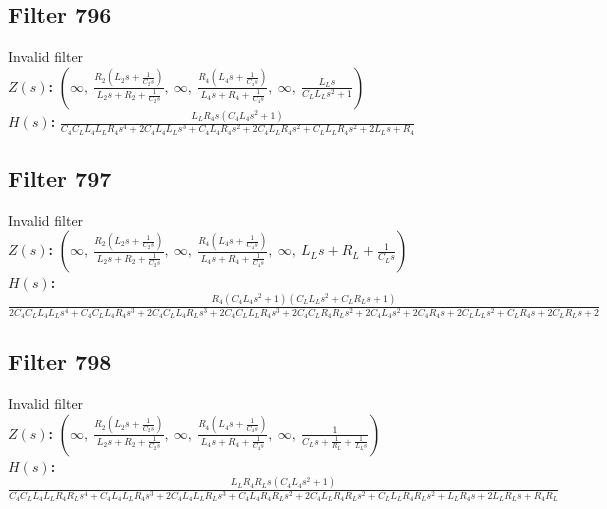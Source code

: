 \documentclass{article}
\begin{document}
\subsection*{Filter 796}
Invalid filter \\ 
\textbf{$Z(s)$:} $\left( \infty, \  \frac{R_{2} \left(L_{2} s + \frac{1}{C_{2} s}\right)}{L_{2} s + R_{2} + \frac{1}{C_{2} s}}, \  \infty, \  \frac{R_{4} \left(L_{4} s + \frac{1}{C_{4} s}\right)}{L_{4} s + R_{4} + \frac{1}{C_{4} s}}, \  \infty, \  \frac{L_{L} s}{C_{L} L_{L} s^{2} + 1}\right)$ \\ 
\textbf{$H(s)$:} $\frac{L_{L} R_{4} s \left(C_{4} L_{4} s^{2} + 1\right)}{C_{4} C_{L} L_{4} L_{L} R_{4} s^{4} + 2 C_{4} L_{4} L_{L} s^{3} + C_{4} L_{4} R_{4} s^{2} + 2 C_{4} L_{L} R_{4} s^{2} + C_{L} L_{L} R_{4} s^{2} + 2 L_{L} s + R_{4}}$ \\ 
\subsection*{Filter 797}
Invalid filter \\ 
\textbf{$Z(s)$:} $\left( \infty, \  \frac{R_{2} \left(L_{2} s + \frac{1}{C_{2} s}\right)}{L_{2} s + R_{2} + \frac{1}{C_{2} s}}, \  \infty, \  \frac{R_{4} \left(L_{4} s + \frac{1}{C_{4} s}\right)}{L_{4} s + R_{4} + \frac{1}{C_{4} s}}, \  \infty, \  L_{L} s + R_{L} + \frac{1}{C_{L} s}\right)$ \\ 
\textbf{$H(s)$:} $\frac{R_{4} \left(C_{4} L_{4} s^{2} + 1\right) \left(C_{L} L_{L} s^{2} + C_{L} R_{L} s + 1\right)}{2 C_{4} C_{L} L_{4} L_{L} s^{4} + C_{4} C_{L} L_{4} R_{4} s^{3} + 2 C_{4} C_{L} L_{4} R_{L} s^{3} + 2 C_{4} C_{L} L_{L} R_{4} s^{3} + 2 C_{4} C_{L} R_{4} R_{L} s^{2} + 2 C_{4} L_{4} s^{2} + 2 C_{4} R_{4} s + 2 C_{L} L_{L} s^{2} + C_{L} R_{4} s + 2 C_{L} R_{L} s + 2}$ \\ 
\subsection*{Filter 798}
Invalid filter \\ 
\textbf{$Z(s)$:} $\left( \infty, \  \frac{R_{2} \left(L_{2} s + \frac{1}{C_{2} s}\right)}{L_{2} s + R_{2} + \frac{1}{C_{2} s}}, \  \infty, \  \frac{R_{4} \left(L_{4} s + \frac{1}{C_{4} s}\right)}{L_{4} s + R_{4} + \frac{1}{C_{4} s}}, \  \infty, \  \frac{1}{C_{L} s + \frac{1}{R_{L}} + \frac{1}{L_{L} s}}\right)$ \\ 
\textbf{$H(s)$:} $\frac{L_{L} R_{4} R_{L} s \left(C_{4} L_{4} s^{2} + 1\right)}{C_{4} C_{L} L_{4} L_{L} R_{4} R_{L} s^{4} + C_{4} L_{4} L_{L} R_{4} s^{3} + 2 C_{4} L_{4} L_{L} R_{L} s^{3} + C_{4} L_{4} R_{4} R_{L} s^{2} + 2 C_{4} L_{L} R_{4} R_{L} s^{2} + C_{L} L_{L} R_{4} R_{L} s^{2} + L_{L} R_{4} s + 2 L_{L} R_{L} s + R_{4} R_{L}}$ \\ 
\end{document}
